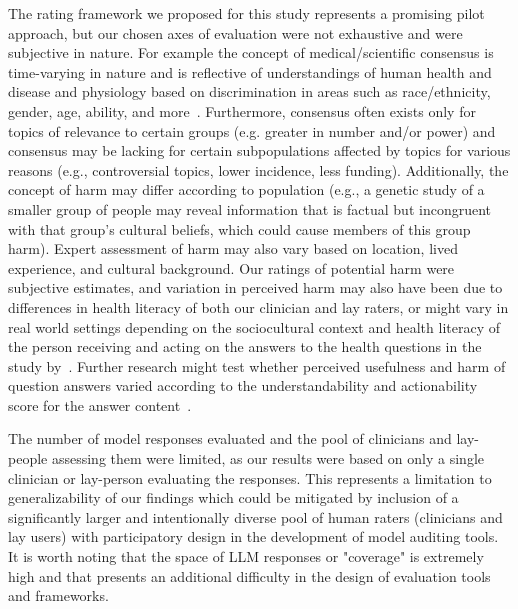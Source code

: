 \documentclass[10pt, letter, onecolumn]{arxiv}
\begin{document}
\begin{refsection}
The rating framework we proposed for this study represents a promising pilot approach, but our chosen axes of evaluation were not exhaustive and were subjective in nature. For example the concept of medical/scientific consensus is time-varying in nature and is reflective of understandings of human health and disease and physiology based on discrimination in areas such as race/ethnicity, gender, age, ability, and more~\cite{kington2021identifying, Mandavilli2021Medical}. Furthermore, consensus often exists only for topics of relevance to certain groups (e.g. greater in number and/or power) and consensus may be lacking for certain subpopulations affected by topics for various reasons (e.g., controversial topics, lower incidence, less funding). Additionally, the concept of harm may differ according to population (e.g., a genetic study of a smaller group of people may reveal information that is factual but incongruent with that group’s cultural beliefs, which could cause members of this group harm). Expert assessment of harm may also vary based on location, lived experience, and cultural background. Our ratings of potential harm were subjective estimates, and variation in perceived harm may also have been due to differences in health literacy of both our clinician and lay raters, or might vary in real world settings depending on the sociocultural context and health literacy of the person receiving and acting on the answers to the health questions in the study by~\citet{berkman2011health}. Further research might test whether perceived usefulness and harm of question answers varied according to the understandability and actionability score for the answer content~\cite{shoemaker2014development}.

The number of model responses evaluated and the pool of clinicians and lay-people assessing them were limited, as our results were based on only a single clinician or lay-person evaluating the responses. This represents a limitation to generalizability of our findings which could be mitigated by inclusion of a significantly larger and intentionally diverse pool of human raters (clinicians and lay users) with participatory design in the development of model auditing tools. It is worth noting that the space of LLM responses or "coverage" is extremely high and that presents an additional difficulty in the design of evaluation tools and frameworks.



\end{refsection}
\end{document}
